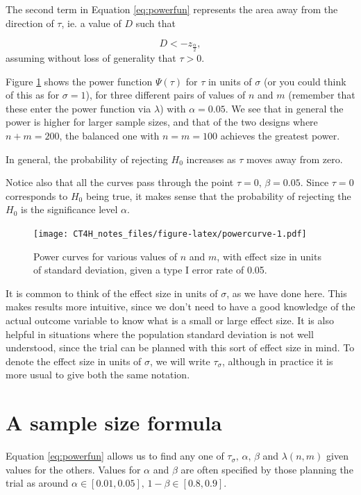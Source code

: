 \documentclass[
  openany]{book}
\theoremstyle{definition}
\theoremstyle{definition}
\theoremstyle{definition}
\theoremstyle{definition}
\theoremstyle{remark}
\begin{document}
The second term in Equation \eqref{eq:powerfun} represents the area away from the direction of \(\tau\), ie. a value of \(D\) such that

\[ D < - z_{\frac{\alpha}{2}},\]
assuming without loss of generality that \(\tau>0\).

Figure \ref{fig:powercurve} shows the power function \(\Psi\left(\tau\right)\) for \(\tau\) in units of \(\sigma\) (or you could think of this as for \(\sigma=1\)), for three different pairs of values of \(n\) and \(m\) (remember that these enter the power function via \(\lambda\)) with \(\alpha=0.05\). We see that in general the power is higher for larger sample sizes, and that of the two designs where \(n+m=200\), the balanced one with \(n=m=100\) achieves the greatest power.

In general, the probability of rejecting \(H_0\) increases as \(\tau\) moves away from zero.

Notice also that all the curves pass through the point \(\tau=0,\,\beta=0.05\). Since \(\tau=0\) corresponds to \(H_0\) being true, it makes sense that the probability of rejecting the \(H_0\) is the significance level \(\alpha\).

\begin{figure}
\centering
\texttt{[image: CT4H\_notes\_files/figure-latex/powercurve-1.pdf]}
\caption{\label{fig:powercurve}Power curves for various values of \(n\) and \(m\), with effect size in units of standard deviation, given a type I error rate of 0.05.}
\end{figure}

It is common to think of the effect size in units of \(\sigma\), as we have done here. This makes results more intuitive, since we don't need to have a good knowledge of the actual outcome variable to know what is a small or large effect size. It is also helpful in situations where the population standard deviation is not well understood, since the trial can be planned with this sort of effect size in mind. To denote the effect size in units of \(\sigma\), we will write \(\tau_\sigma\), although in practice it is more usual to give both the same notation.

\hypertarget{sec-ssformulacont}{%
\section{A sample size formula}\label{sec-ssformulacont}}

Equation \eqref{eq:powerfun} allows us to find any one of \(\tau_\sigma,\,\alpha,\,\beta\) and \(\lambda\left(n,m\right)\) given values for the others. Values for \(\alpha\) and \(\beta\) are often specified by those planning the trial as around \(\alpha \in \left[0.01,0.05\right],\,1-\beta\in\left[0.8,0.9\right]\).
\end{document}
